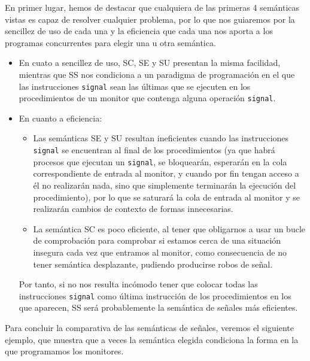 En primer lugar, hemos de destacar que cualquiera de las primeras 4 semánticas vistas es capaz de resolver cualquier problema, por lo que nos guiaremos por la sencillez de uso de cada una y la eficiencia que cada una nos aporta a los programas concurrentes para elegir una u otra semántica.
\begin{itemize}
    \item En cuato a sencillez de uso, SC, SE y SU presentan la misma facilidad, mientras que SS nos condiciona a un paradigma de programación en el que las instrucciones \verb|signal| sean las últimas que se ejecuten en los procedimientos de un monitor que contenga alguna operación \verb|signal|.
    \item En cuanto a eficiencia:
        \begin{itemize}
            \item Las semánticas SE y SU resultan ineficientes cuando las instrucciones \verb|signal| se encuentran al final de los procedimientos (ya que habrá procesos que ejecutan un \verb|signal|, se bloquearán, esperarán en la cola correspondiente de entrada al monitor, y cuando por fin tengan acceso a él no realizarán nada, sino que simplemente terminarán la ejecución del procedimiento), por lo que se saturará la cola de entrada al monitor y se realizarán cambios de contexto de formas innecesarias.
            \item La semántica SC es poco eficiente, al tener que obligarnos a usar un bucle de comprobación para comprobar si estamos cerca de una situación insegura cada vez que entramos al monitor, como consecuencia de no tener semántica desplazante, pudiendo producirse robos de señal.
        \end{itemize}
        Por tanto, si no nos resulta incómodo tener que colocar todas las instrucciones \verb|signal| como última instrucción de los procedimientos en los que aparecen, SS será probablemente la semántica de señales más eficientes.
\end{itemize}

Para concluir la comparativa de las semánticas de señales, veremos el siguiente ejemplo, que muestra que a veces la semántica elegida condiciona la forma en la que programamos los monitores.


